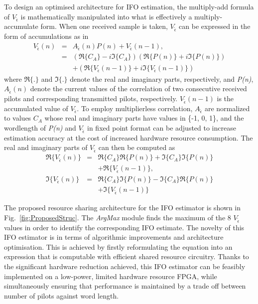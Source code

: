 To design an optimised architecture for IFO estimation, the multiply-add formula of $V_{\tilde{\epsilon}}$ is mathematically manipulated into what is effectively a multiply-accumulate form.
When one received sample is taken, $V_{\tilde{\epsilon}}$ can be expressed in the form of accumulations as in
\begin{eqnarray}
\label{complexVi}
V_{\tilde{\epsilon}}(n)	&=&   A_{\tilde{\epsilon}}(n) P(n)  + V_{\tilde{\epsilon}}(n-1), \nonumber \\
						&=& (\Re{\{C_A\}} - i \Im{\{C_A\}})  (\Re{\{P(n)\}} + i \Im{\{P(n)\}}) \nonumber \\
	 					&  &+ (\Re{\{V_{\tilde{\epsilon}}(n-1)\}}+i \Im{\{V_{\tilde{\epsilon}}(n-1)\}})
\end{eqnarray}
where $\Re{\{.\}}$ and $\Im{\{.\}}$ denote the real and imaginary parts, respectively, and \emph{P(n)}, $A_{\tilde{\epsilon}}(n)$ denote the current values of the correlation of two consecutive received pilots and corresponding transmitted pilots, respectively.
$V_{\tilde{\epsilon}}(n-1)$ is the accumulated value of $V_{\tilde{\epsilon}}$.
To employ multiplierless correlation, $A_{\tilde{\epsilon}}$ are normalized to values $C_A$ whose real and imaginary parts have values in \{-1, 0, 1\}, and the wordlength of \emph{P(n)} and $V_{\tilde{\epsilon}}$ in fixed point format can be adjusted to increase estimation accuracy at the cost of increased hardware resource consumption.
The real and imaginary parts of $V_{\tilde{\epsilon}}$ can then be computed as
\begin{eqnarray}
\label{realimaginaryVi}
\Re{\{V_{\tilde{\epsilon}}(n)\}} &=& \Re{\{C_A\}} \Re{\{ P(n)\}}+\Im{\{C_A\}} \Im{\{ P(n)\}} \nonumber \\
								& &+ \Re{\{V_{\tilde{\epsilon}}(n-1)\}} , 					\nonumber \\
\Im{\{V_{\tilde{\epsilon}}(n)\}} &=& \Re{\{C_A\}} \Im{\{ P(n)\}}-\Im{\{C_A\}} \Re{\{ P(n)\}}	\nonumber \\
								& &+ \Im{\{V_{\tilde{\epsilon}}(n-1)\}}
\end{eqnarray}

The proposed resource sharing architecture for the IFO estimator is shown in Fig.~\ref{fig:ProposedStruc}. The \emph{ArgMax} module finds the maximum of the 8 $V_{\tilde{\epsilon}}$ values in order to identify the corresponding IFO estimate.
The novelty of this IFO estimator is in terms of algorithmic improvements and architecture optimisation. This is achieved by firstly reformulating the equation into an expression that is computable with efficient shared resource circuitry.
Thanks to the significant hardware reduction achieved, this IFO estimator can be feasibly implemented on a low-power, limited hardware resource FPGA, while simultaneously ensuring that performance is maintained by a trade off between number of pilots against word length.

